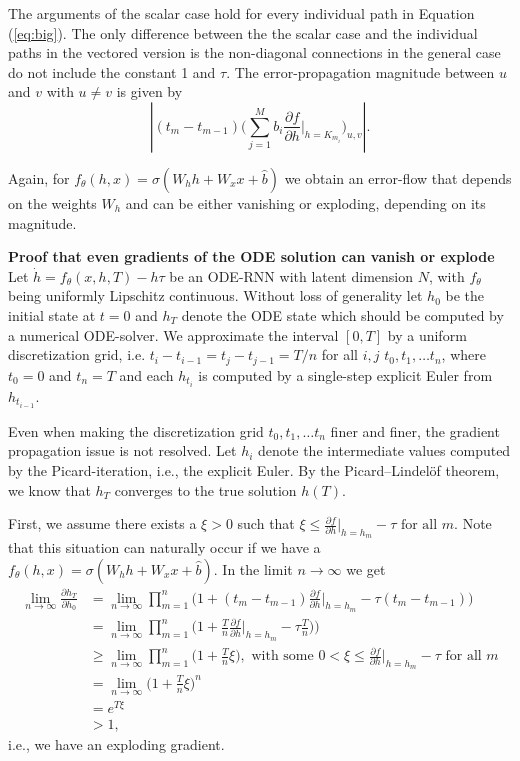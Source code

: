\documentclass{article}
\begin{document}
The arguments of the scalar case hold for every individual path in Equation (\ref{eq:big}).
The only difference between the the scalar case and the individual paths in the vectored version is the non-diagonal connections in the general case do not include the constant 1 and $\tau$. The error-propagation magnitude between $u$ and $v$ with $u\neq v$ is given by 
\begin{equation}\label{eq:nondiag_value}
    | (t_m-t_{m-1})\Big(\sum_{j=1}^{M} b_i \frac{\partial f}{\partial h}\Big|_{h=K_{m_i}} \Big)_{u,v} |.
\end{equation}

Again, for $f_{\theta}(h,x) = \sigma(W_h h + W_x x + \hat{b})$ we obtain an error-flow that depends on the weights $W_h$ and can be either vanishing or exploding, depending on its magnitude.

\textbf{Proof that even gradients of the ODE solution can vanish or explode}
Let $\dot{h} = f_\theta(x,h,T) - h \tau$ be an ODE-RNN with latent dimension $N$, with $f_\theta$ being uniformly Lipschitz continuous. Without loss of generality let $h_0$ be the initial state at $t=0$ and $h_T$ denote the ODE state which should be computed by a numerical ODE-solver.
We approximate the interval $[0,T]$ by a uniform discretization grid, i.e. $t_i-t_{i-1} = t_j-t_{j-1} = T/n$ for all $i,j$ $t_0,t_1,\dots t_n$, where $t_0=0$ and $t_n=T$ and each $h_{t_i}$ is computed by a single-step explicit Euler from $h_{t_{i-1}}$. 

Even when making the discretization grid $t_0,t_1,\dots t_n$ finer and finer, the gradient propagation issue is not resolved. Let $h_i$ denote the intermediate values computed by the Picard-iteration, i.e., the explicit Euler. By the Picard–Lindelöf theorem, we know that $h_T$ converges to the true solution $h(T)$. 

First, we assume there exists a $\xi>0$ such that  $\xi \leq \frac{\partial f}{\partial h}\Big|_{h=h_{m}} - \tau\text { for all }m$. Note that this situation can naturally occur if we have a  $f_{\theta}(h,x) = \sigma(W_h h + W_x x + \hat{b})$.
In the limit $n\rightarrow \infty$ we get
\begin{align*}
\lim_{n\rightarrow \infty} \frac{\partial h_{T}}{\partial h_{0}} & = \lim_{n\rightarrow \infty}  \prod_{m=1}^{n}\Big( 1 + (t_m-t_{m-1}) \frac{\partial f}{\partial h}\Big|_{h=h_{m}} - \tau (t_m-t_{m-1}) \Big)\\
&=  \lim_{n\rightarrow \infty}  \prod_{m=1}^{n}\Big( 1 + \frac{T}{n} \frac{\partial f}{\partial h}\Big|_{h=h_{m}} - \tau \frac{T}{n}) \Big)\\
&\geq  \lim_{n\rightarrow \infty}  \prod_{m=1}^{n}\Big( 1 + \frac{T}{n} \xi \Big), \text{  with some  } 0 < \xi \leq \frac{\partial f}{\partial h}\Big|_{h=h_{m}} - \tau\text { for all }m\\
&=  \lim_{n\rightarrow \infty}  \Big( 1 + \frac{T}{n} \xi \Big)^n \\
& = e^{T\xi}\\
& > 1,
\end{align*}
i.e., we have an exploding gradient.
\end{document}
